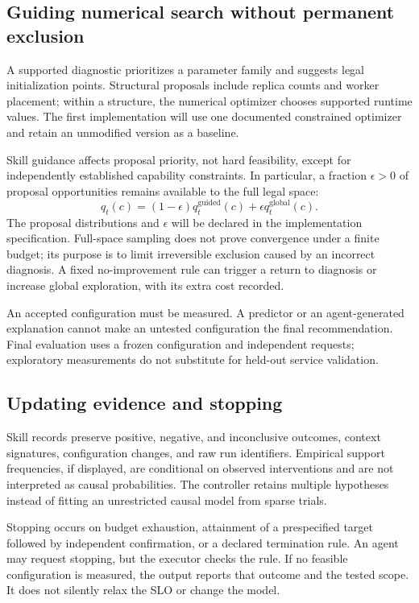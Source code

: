 \documentclass[preprint,12pt]{elsarticle}
\begin{document}
\subsection{Guiding numerical search without permanent exclusion}
A supported diagnostic prioritizes a parameter family and suggests legal initialization points. Structural proposals include replica counts and worker placement; within a structure, the numerical optimizer chooses supported runtime values. The first implementation will use one documented constrained optimizer and retain an unmodified version as a baseline.

Skill guidance affects proposal priority, not hard feasibility, except for independently established capability constraints. In particular, a fraction $\epsilon>0$ of proposal opportunities remains available to the full legal space:
\begin{equation}
 q_t(c)=(1-\epsilon)q_t^{\mathrm{guided}}(c)
                 +\epsilon q_t^{\mathrm{global}}(c).
\end{equation}
The proposal distributions and $\epsilon$ will be declared in the implementation specification. Full-space sampling does not prove convergence under a finite budget; its purpose is to limit irreversible exclusion caused by an incorrect diagnosis. A fixed no-improvement rule can trigger a return to diagnosis or increase global exploration, with its extra cost recorded.

An accepted configuration must be measured. A predictor or an agent-generated explanation cannot make an untested configuration the final recommendation. Final evaluation uses a frozen configuration and independent requests; exploratory measurements do not substitute for held-out service validation.

\subsection{Updating evidence and stopping}
Skill records preserve positive, negative, and inconclusive outcomes, context signatures, configuration changes, and raw run identifiers. Empirical support frequencies, if displayed, are conditional on observed interventions and are not interpreted as causal probabilities. The controller retains multiple hypotheses instead of fitting an unrestricted causal model from sparse trials.

Stopping occurs on budget exhaustion, attainment of a prespecified target followed by independent confirmation, or a declared termination rule. An agent may request stopping, but the executor checks the rule. If no feasible configuration is measured, the output reports that outcome and the tested scope. It does not silently relax the SLO or change the model.
\end{document}
